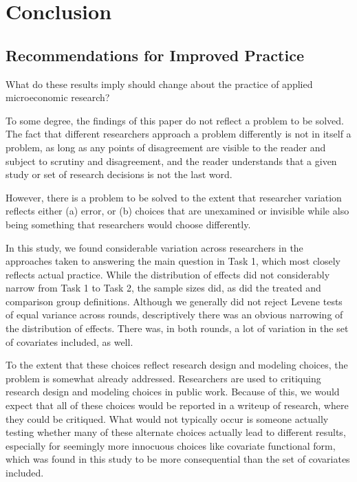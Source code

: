 \documentclass[
  letterpaper,
  DIV=11,
  numbers=noendperiod]{scrartcl}
\begin{document}
\hypertarget{conclusion}{%
\section{Conclusion}\label{conclusion}}

\hypertarget{recommendations-for-improved-practice}{%
\subsection{Recommendations for Improved
Practice}\label{recommendations-for-improved-practice}}

What do these results imply should change about the practice of applied
microeconomic research?

To some degree, the findings of this paper do not reflect a problem to
be solved. The fact that different researchers approach a problem
differently is not in itself a problem, as long as any points of
disagreement are visible to the reader and subject to scrutiny and
disagreement, and the reader understands that a given study or set of
research decisions is not the last word.

However, there is a problem to be solved to the extent that researcher
variation reflects either (a) error, or (b) choices that are unexamined
or invisible while also being something that researchers would choose
differently.

In this study, we found considerable variation across researchers in the
approaches taken to answering the main question in Task 1, which most
closely reflects actual practice. While the distribution of effects did
not considerably narrow from Task 1 to Task 2, the sample sizes did, as
did the treated and comparison group definitions. Although we generally
did not reject Levene tests of equal variance across rounds,
descriptively there was an obvious narrowing of the distribution of
effects. There was, in both rounds, a lot of variation in the set of
covariates included, as well.

To the extent that these choices reflect research design and modeling
choices, the problem is somewhat already addressed. Researchers are used
to critiquing research design and modeling choices in public work.
Because of this, we would expect that all of these choices would be
reported in a writeup of research, where they could be critiqued. What
would not typically occur is someone actually testing whether many of
these alternate choices actually lead to different results, especially
for seemingly more innocuous choices like covariate functional form,
which was found in this study to be more consequential than the set of
covariates included.
\end{document}
